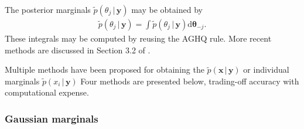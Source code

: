 \documentclass[a4paper, nobind]{templates/ociamthesis}
\begin{document}
The posterior marginals \(\tilde p(\theta_j \, | \, \mathbf{y})\) may be obtained by
\begin{align}
\tilde p(\theta_j \, | \, \mathbf{y}) = \int \tilde p(\theta_j \, | \, \mathbf{y}) \text{d} \boldsymbol{\mathbf{\theta}}_{-j}.
\end{align}
These integrals may be computed by reusing the AGHQ rule.
More recent methods are discussed in Section 3.2 of \textcite{martins2013bayesian}.

Multiple methods have been proposed for obtaining the \(\tilde p(\mathbf{x} \, | \, \mathbf{y})\) or individual marginals \(\tilde p(x_i \, | \, \mathbf{y})\)
Four methods are presented below, trading-off accuracy with computational expense.

\hypertarget{gaussian-marginals}{%
\subsubsection{Gaussian marginals}\label{gaussian-marginals}}
\end{document}
